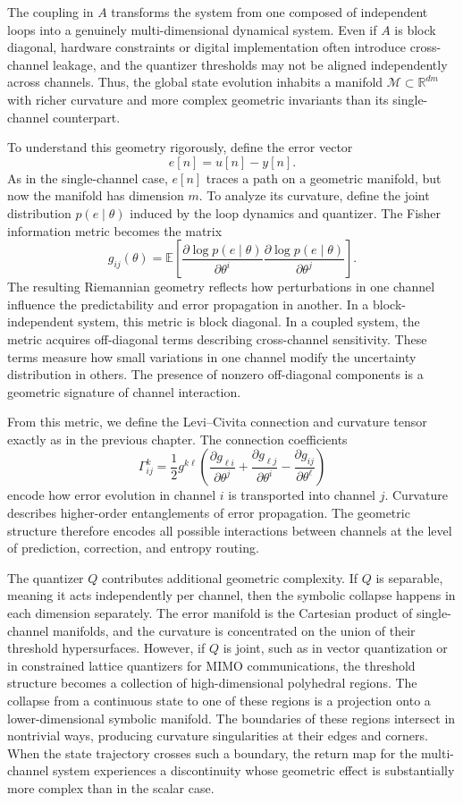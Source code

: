 The coupling in \(A\) transforms the system from one composed of independent loops into a genuinely multi-dimensional dynamical system. Even if \(A\) is block diagonal, hardware constraints or digital implementation often introduce cross-channel leakage, and the quantizer thresholds may not be aligned independently across channels. Thus, the global state evolution inhabits a manifold \(\mathcal{M} \subset \mathbb{R}^{dm}\) with richer curvature and more complex geometric invariants than its single-channel counterpart.

To understand this geometry rigorously, define the error vector
\[
e[n] = u[n] - y[n].
\]
As in the single-channel case, \(e[n]\) traces a path on a geometric manifold, but now the manifold has dimension \(m\). To analyze its curvature, define the joint distribution \(p(e \mid \theta)\) induced by the loop dynamics and quantizer. The Fisher information metric becomes the matrix
\[
g_{ij}(\theta) = \mathbb{E}\left[ \frac{\partial \log p(e \mid \theta)}{\partial \theta^{i}} \frac{\partial \log p(e \mid \theta)}{\partial \theta^{j}} \right].
\]
The resulting Riemannian geometry reflects how perturbations in one channel influence the predictability and error propagation in another. In a block-independent system, this metric is block diagonal. In a coupled system, the metric acquires off-diagonal terms describing cross-channel sensitivity. These terms measure how small variations in one channel modify the uncertainty distribution in others. The presence of nonzero off-diagonal components is a geometric signature of channel interaction.

From this metric, we define the Levi--Civita connection and curvature tensor exactly as in the previous chapter. The connection coefficients
\[
\Gamma^{k}_{ij} = \frac{1}{2} g^{k\ell} \left( \frac{\partial g_{\ell i}}{\partial \theta^{j}} + \frac{\partial g_{\ell j}}{\partial \theta^{i}} - \frac{\partial g_{ij}}{\partial \theta^{\ell}} \right)
\]
encode how error evolution in channel \(i\) is transported into channel \(j\). Curvature describes higher-order entanglements of error propagation. The geometric structure therefore encodes all possible interactions between channels at the level of prediction, correction, and entropy routing.

The quantizer \(Q\) contributes additional geometric complexity. If \(Q\) is separable, meaning it acts independently per channel, then the symbolic collapse happens in each dimension separately. The error manifold is the Cartesian product of single-channel manifolds, and the curvature is concentrated on the union of their threshold hypersurfaces. However, if \(Q\) is joint, such as in vector quantization or in constrained lattice quantizers for MIMO communications, the threshold structure becomes a collection of high-dimensional polyhedral regions. The collapse from a continuous state to one of these regions is a projection onto a lower-dimensional symbolic manifold. The boundaries of these regions intersect in nontrivial ways, producing curvature singularities at their edges and corners. When the state trajectory crosses such a boundary, the return map for the multi-channel system experiences a discontinuity whose geometric effect is substantially more complex than in the scalar case.

